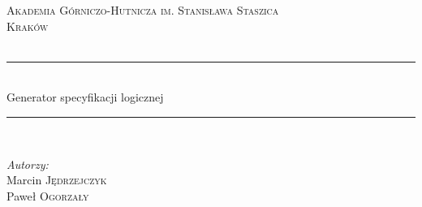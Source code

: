 \documentclass[a4paper, 11pt]{article}
\begin{document}
	
	\begin{titlepage}
		
		
		
		\newcommand{\HRule}{\rule{\linewidth}{0.5mm}} %
		
		\center %
		
		
		\textsc{\LARGE Akademia Górniczo-Hutnicza im. Stanisława Staszica}\\[1.5cm] %
		\textsc{\Large Kraków}\\[0.5cm] %
		\textsc{\large }\\[0.5cm] %
		
		
		\HRule \\[0.4cm]
		{\fontsize{38}{50}\selectfont Generator specyfikacji logicznej}
		\HRule \\[5.5cm]
		
	
\begin{minipage}{0.4\textwidth}
\begin{flushleft} \large 
\emph{Autorzy:}\\
Marcin \textsc{Jędrzejczyk}\\ %
Paweł \textsc{Ogorzały} \\


\end{flushleft}
\end{minipage}
\end{titlepage}
\end{document}
